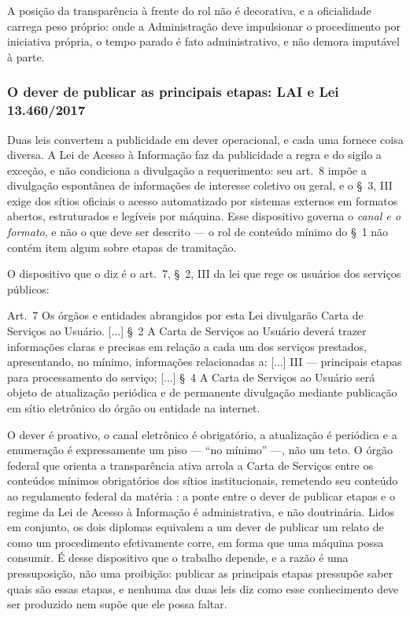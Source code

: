 \noindent A posição da transparência à frente do rol não é decorativa, e a oficialidade carrega
peso próprio: onde a Administração deve impulsionar o procedimento por iniciativa própria, o tempo
parado é fato administrativo, e não demora imputável à parte.

\subsubsection{O dever de publicar as principais etapas: LAI e Lei 13.460/2017}

Duas leis convertem a publicidade em dever operacional, e cada uma fornece coisa diversa. A
Lei de Acesso à Informação \cite{brasil2011lai} faz da publicidade a regra e do sigilo a exceção, e
não condiciona a divulgação a requerimento: seu art.~8\textordmasculine{} impõe a divulgação
espontânea de informações de interesse coletivo ou geral, e o \S~3\textordmasculine{}, III exige dos
sítios oficiais o acesso automatizado por sistemas externos em formatos abertos, estruturados e
legíveis por máquina. Esse dispositivo governa o \emph{canal e o formato}, e não o que deve ser
descrito --- o rol de conteúdo mínimo do \S~1\textordmasculine{} não contém item algum sobre etapas
de tramitação.

O dispositivo que o diz é o art.~7\textordmasculine{}, \S~2\textordmasculine{}, III da lei que rege
os usuários dos serviços públicos:

\begin{citacao}
Art.~7\textordmasculine{} Os órgãos e entidades abrangidos por esta Lei divulgarão Carta de Serviços
ao Usuário. {[...]} \S~2\textordmasculine{} A Carta de Serviços ao Usuário deverá trazer informações
claras e precisas em relação a cada um dos serviços prestados, apresentando, no mínimo, informações
relacionadas a: {[...]} III --- principais etapas para processamento do serviço; {[...]}
\S~4\textordmasculine{} A Carta de Serviços ao Usuário será objeto de atualização periódica e de
permanente divulgação mediante publicação em sítio eletrônico do órgão ou entidade na internet.
\cite[art.~7\textordmasculine{}]{brasil2017cdu}
\end{citacao}

\noindent O dever é proativo, o canal eletrônico é obrigatório, a atualização é periódica e a
enumeração é expressamente um piso --- ``no mínimo'' ---, não um teto. O órgão federal que orienta
a transparência ativa arrola a Carta de Serviços entre os conteúdos mínimos obrigatórios dos sítios
institucionais, remetendo seu conteúdo ao regulamento federal da matéria
\cite{brcgu2019gta,brbrasil2017decreto9094}: a ponte entre o dever de publicar etapas e o regime da
Lei de Acesso à Informação é administrativa, e não doutrinária. Lidos em conjunto, os dois diplomas
equivalem a um dever de publicar um relato de como um procedimento efetivamente corre, em forma que
uma máquina possa consumir. É desse dispositivo que o trabalho depende, e a razão é uma
pressuposição, não uma proibição: publicar as principais etapas pressupõe saber quais são essas
etapas, e nenhuma das duas leis diz como esse conhecimento deve ser produzido nem supõe que ele
possa faltar.

